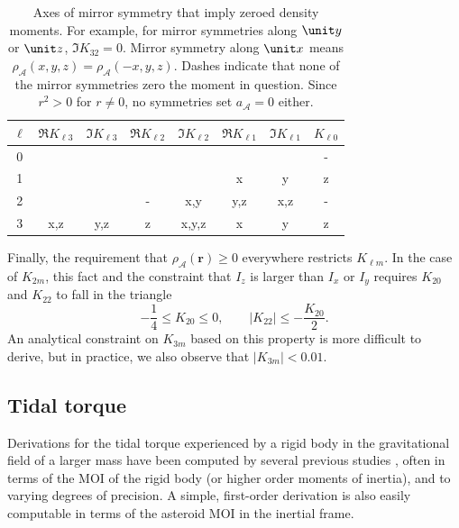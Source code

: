 \begin{table}
  \centering
  \begin{tabular}{c|ccccccc}
    \hline
    $\ell$ & $\Re K_{\ell 3}$ & $\Im K_{\ell 3}$ & $\Re K_{\ell 2}$ & $\Im K_{\ell 2}$ & $\Re K_{\ell 1}$ & $\Im K_{\ell 1}$ & $K_{\ell 0}$ \\ \hline
    0 &  &  &  &  &  &  & -\\ 
    1 &  &  &  &  & x & y & z\\ 
    2 &  &  & - & x,y & y,z & x,z & -\\ 
    3 & x,z & y,z & z & x,y,z & x & y & z\\ \hline
  \end{tabular}
  \caption{Axes of mirror symmetry that imply zeroed density moments. For example, for mirror symmetries along $\unit y$ or $\unit z$, $\Im K_{32}=0$. Mirror symmetry along $\unit x$ means $\rho_\mathcal{A}(x, y, z) = \rho_\mathcal{A}(-x, y, z)$. Dashes indicate that none of the mirror symmetries zero the moment in question. Since $r^2>0$ for $r\neq 0$, no symmetries set $a_\mathcal{A}=0$ either.}
  \label{tab:klm-symmetries}
\end{table} 

Finally, the requirement that $\rho_\mathcal{A}(\bm r) \geq 0$ everywhere restricts $K_{\ell m}$. In the case of $K_{2m}$, this fact and the constraint that $I_z$ is larger than $I_x$ or $I_y$ requires $K_{20}$ and $K_{22}$ to fall in the triangle
\begin{equation}
  -\frac{1}{4} \leq K_{20} \leq 0, \qquad |K_{22}| \leq -\frac{K_{20}}{2}.
  \label{eqn:parameter-bounds}
\end{equation}
An analytical constraint on $K_{3m}$ based on this property is more difficult to derive, but in practice, we also observe that $|K_{3m}| < 0.01$.




\subsection{Tidal torque}
\label{sec:tidal-torque}

Derivations for the tidal torque experienced by a rigid body in the gravitational field of a larger mass have been computed by several previous studies \cite{paul88,HouMar2017,BOUE2009750, ashenberg07}, often in terms of the MOI of the rigid body (or higher order moments of inertia), and to varying degrees of precision. A simple, first-order derivation is also easily computable in terms of the asteroid MOI in the inertial frame.

